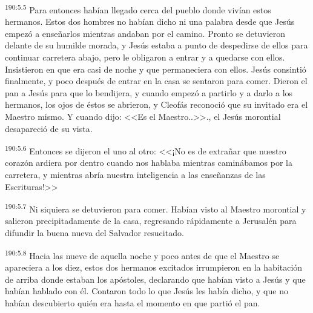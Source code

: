 \par 
\textsuperscript{190:5.5} Para entonces habían llegado cerca del pueblo donde vivían estos hermanos. Estos dos hombres no habían dicho ni una palabra desde que Jesús empezó a enseñarlos mientras andaban por el camino. Pronto se detuvieron delante de su humilde morada, y Jesús estaba a punto de despedirse de ellos para continuar carretera abajo, pero le obligaron a entrar y a quedarse con ellos. Insistieron en que era casi de noche y que permaneciera con ellos. Jesús consintió finalmente, y poco después de entrar en la casa se sentaron para comer. Dieron el pan a Jesús para que lo bendijera, y cuando empezó a partirlo y a darlo a los hermanos, los ojos de éstos se abrieron, y Cleofás reconoció que su invitado era el Maestro mismo. Y cuando dijo: <<Es el Maestro..>>., el Jesús morontial desapareció de su vista.

\par 
\textsuperscript{190:5.6} Entonces se dijeron el uno al otro: <<¡No es de extrañar que nuestro corazón ardiera por dentro cuando nos hablaba mientras caminábamos por la carretera, y mientras abría nuestra inteligencia a las enseñanzas de las Escrituras!>>

\par 
\textsuperscript{190:5.7} Ni siquiera se detuvieron para comer. Habían visto al Maestro morontial y salieron precipitadamente de la casa, regresando rápidamente a Jerusalén para difundir la buena nueva del Salvador resucitado.

\par 
\textsuperscript{190:5.8} Hacia las nueve de aquella noche y poco antes de que el Maestro se apareciera a los diez, estos dos hermanos excitados irrumpieron en la habitación de arriba donde estaban los apóstoles, declarando que habían visto a Jesús y que habían hablado con él. Contaron todo lo que Jesús les había dicho, y que no habían descubierto quién era hasta el momento en que partió el pan.